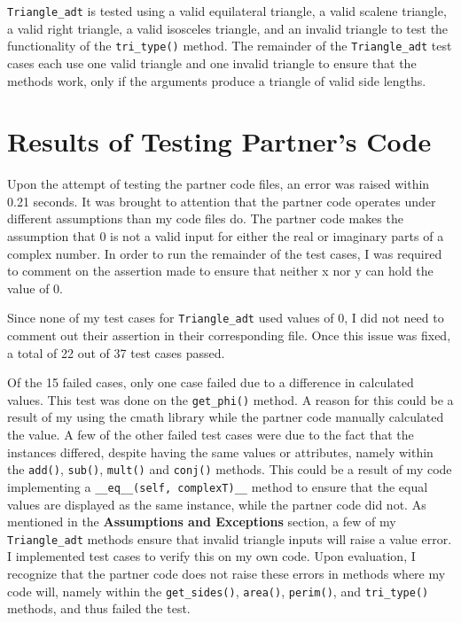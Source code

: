 \documentclass[12pt]{article}
\begin{document}
\verb|Triangle_adt| is tested using a valid equilateral triangle, a valid scalene triangle, a valid right triangle, a valid isosceles triangle, and an invalid triangle to test the functionality of the \verb|tri_type()| method. The remainder of the \verb|Triangle_adt| test cases each use one valid triangle and one invalid triangle to ensure that the methods work, only if the arguments produce a triangle of valid side lengths.


\section{Results of Testing Partner's Code}

Upon the attempt of testing the partner code files, an error was raised within 0.21 seconds. It was brought to attention that the partner code operates under different assumptions than my code files do. The partner code makes the assumption that 0 is not a valid input for either the real or imaginary parts of a complex number. In order to run the remainder of the test cases, I was required to comment on the assertion made to ensure that neither x nor y can hold the value of 0. 

Since none of my test cases for \verb|Triangle_adt| used values of 0, I did not need to comment out their assertion in their corresponding file. Once this issue was fixed, a total of 22 out of 37 test cases passed.

Of the 15 failed cases, only one case failed due to a difference in calculated values. This test was done on the \verb|get_phi()| method. A reason for this could be a result of my using the cmath library while the partner code manually calculated the value. A few of the other failed test cases were due to the fact that the instances differed, despite having the same values or attributes, namely within the \verb|add()|, \verb|sub()|, \verb|mult()| and \verb|conj()| methods. This could be a result of my code implementing a \verb|__eq__(self, complexT)__| method to ensure that the equal values are displayed as the same instance, while the partner code did not.  As mentioned in the \textbf{Assumptions and Exceptions} section, a few of my \verb|Triangle_adt| methods ensure that invalid triangle inputs will raise a value error. I implemented test cases to verify this on my own code. Upon evaluation, I recognize that the partner code does not raise these errors in methods where my code will, namely within the \verb|get_sides()|, \verb|area()|, \verb|perim()|, and \verb|tri_type()| methods, and thus failed the test.
\end{document}
